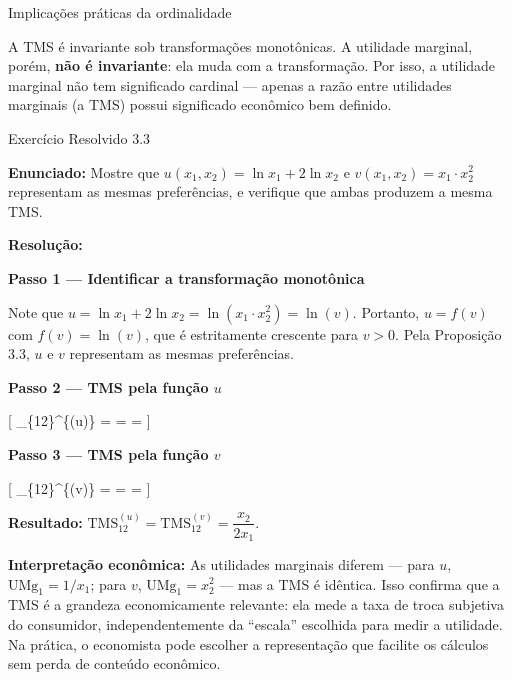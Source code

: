 \documentclass[11pt,twoside,openright]{book}
\begin{document}
\begin{tipbox}{Implicações práticas da ordinalidade}

A TMS é invariante sob transformações monotônicas. A utilidade marginal,
porém, \textbf{não é invariante}: ela muda com a transformação. Por
isso, a utilidade marginal não tem significado cardinal --- apenas a
razão entre utilidades marginais (a TMS) possui significado econômico
bem definido.

\end{tipbox}

\begin{exresolvidobox}{Exercício Resolvido 3.3}

\textbf{Enunciado:} Mostre que \(u(x_1, x_2) = \ln x_1 + 2\ln x_2\) e
\(v(x_1, x_2) = x_1 \cdot x_2^2\) representam as mesmas preferências, e
verifique que ambas produzem a mesma TMS.

\textbf{Resolução:}

\textbf{Passo 1 --- Identificar a transformação monotônica}

Note que \(u = \ln x_1 + 2\ln x_2 = \ln(x_1 \cdot x_2^2) = \ln(v)\).
Portanto, \(u = f(v)\) com \(f(v) = \ln(v)\), que é estritamente
crescente para \(v > 0\). Pela Proposição 3.3, \(u\) e \(v\) representam
as mesmas preferências.

\textbf{Passo 2 --- TMS pela função \(u\)}

{[} \_\{12\}\^{}\{(u)\} =
 =
 =  {]}

\textbf{Passo 3 --- TMS pela função \(v\)}

{[} \_\{12\}\^{}\{(v)\} =
 =
 =  {]}

\textbf{Resultado:}
\(\text{TMS}_{12}^{(u)} = \text{TMS}_{12}^{(v)} = \dfrac{x_2}{2x_1}\).

\textbf{Interpretação econômica:} As utilidades marginais diferem ---
para \(u\), \(\text{UMg}_1 = 1/x_1\); para \(v\),
\(\text{UMg}_1 = x_2^2\) --- mas a TMS é idêntica. Isso confirma que a
TMS é a grandeza economicamente relevante: ela mede a taxa de troca
subjetiva do consumidor, independentemente da ``escala'' escolhida para
medir a utilidade. Na prática, o economista pode escolher a
representação que facilite os cálculos sem perda de conteúdo econômico.

\end{exresolvidobox}
\end{document}
